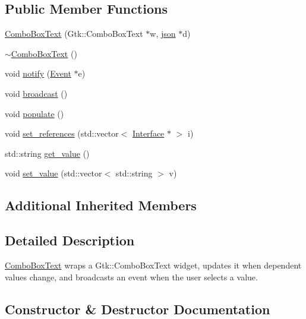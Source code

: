 \subsection*{Public Member Functions}
\begin{DoxyCompactItemize}
\item 
\hyperlink{classmc_1_1ComboBoxText_a1131fdddb8a549ff4cac54d8b58ffad8}{Combo\+Box\+Text} (Gtk\+::\+Combo\+Box\+Text $\ast$w, \hyperlink{application_8hpp_ab701e3ac61a85b337ec5c1abaad6742d}{json} $\ast$d)
\item 
\hyperlink{classmc_1_1ComboBoxText_a87084073a37ee5e34852b4e2fd539195}{$\sim$\+Combo\+Box\+Text} ()
\item 
void \hyperlink{classmc_1_1ComboBoxText_acc725c32e20e84062c31fdb7b522f61b}{notify} (\hyperlink{classmc_1_1Event}{Event} $\ast$e)
\item 
void \hyperlink{classmc_1_1ComboBoxText_aef38e11777ac04e0b91c709eddbf3197}{broadcast} ()
\item 
void \hyperlink{classmc_1_1ComboBoxText_acac1e8f7b02c7cc76098768c6bcf9d12}{populate} ()
\item 
void \hyperlink{classmc_1_1ComboBoxText_af140937525bfd17e74a7786a24f086bb}{set\+\_\+references} (std\+::vector$<$ \hyperlink{classmc_1_1Interface}{Interface} $\ast$ $>$ i)
\item 
std\+::string \hyperlink{classmc_1_1ComboBoxText_a38664e490a06e3976aeefe6e69896df3}{get\+\_\+value} ()
\item 
void \hyperlink{classmc_1_1ComboBoxText_a2e5eaed5544e2c320ec4b918f3bb9a59}{set\+\_\+value} (std\+::vector$<$ std\+::string $>$ v)
\end{DoxyCompactItemize}
\subsection*{Additional Inherited Members}


\subsection{Detailed Description}
\hyperlink{classmc_1_1ComboBoxText}{Combo\+Box\+Text} wraps a Gtk\+::\+Combo\+Box\+Text widget, updates it when dependent values change, and broadcasts an event when the user selects a value. 

\subsection{Constructor \& Destructor Documentation}
